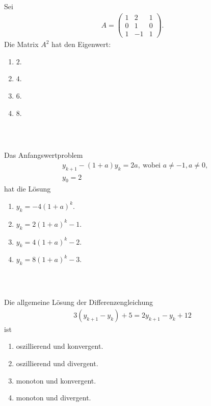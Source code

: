 \subsection*{}
Sei
\begin{align*}
A
=
\begin{pmatrix}
1 & 2 & 1\\
0 & 1 & 0\\
1 & -1 & 1
\end{pmatrix}.
\end{align*}
Die Matrix $ A^2 $ hat den Eigenwert:
\renewcommand{\labelenumi}{(\alph{enumi})}
\begin{enumerate}
\item 
$ 2 $.
\item
$ 4 $.
\item
$ 6 $.
\item
$ 8 $.
\end{enumerate}
\ \\
\subsection*{}
Das Anfangswertproblem
\begin{align*}
&y_{k+1} -(1+a) y_k = 2 a, \ \textrm{wobei } a \neq -1, a \neq 0,\\
&y_0 = 2
\end{align*}
hat die Lösung
\renewcommand{\labelenumi}{(\alph{enumi})}
\begin{enumerate}
	\item 
	$ y_k = -4 ( 1+a)^k $.
	\item
	$ y_k = 2 ( 1+a)^k  -1$.
	\item
	$ y_k = 4 ( 1+a)^k -2 $.
	\item
	$ y_k = 8 ( 1+a)^k -3$.
\end{enumerate}
\ \\
\subsection*{}
Die allgemeine Lösung der Differenzengleichung
\begin{align*}
3 (y_{k+1}   -y_k  )+ 5 = 2 y_{k+1} -y_k + 12 
\end{align*}
ist
\renewcommand{\labelenumi}{(\alph{enumi})}
\begin{enumerate}
\item
oszillierend und konvergent.
\item
oszillierend und divergent.	
\item 
monoton und konvergent.
\item
monoton und divergent.
\end{enumerate}
\ \\
